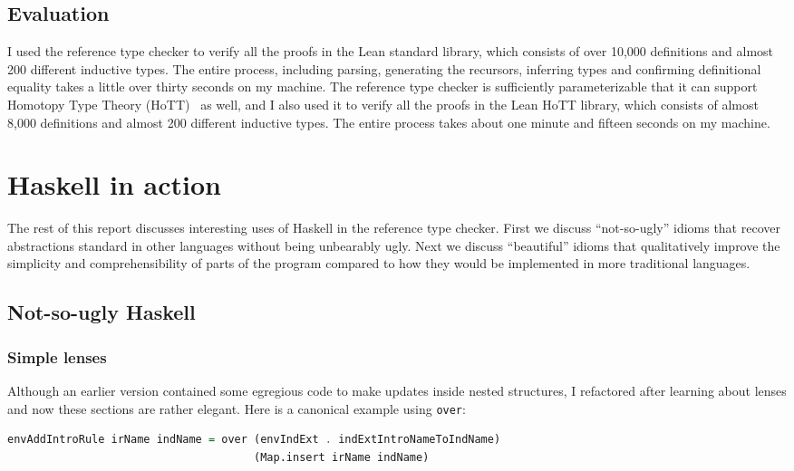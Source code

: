 \documentclass{article}
\begin{document}
\begin{spacing}{1.1}
\subsection{Evaluation}

I used the reference type checker to verify all the proofs in the Lean standard library, which consists of over 10,000 definitions and almost 200 different inductive types. The entire process, including parsing, generating the recursors, inferring types and confirming definitional equality takes a little over thirty seconds on my machine. The reference type checker is sufficiently parameterizable that it can support Homotopy Type Theory (HoTT)~\cite{awodey2015homotopy} as well, and I also used it to verify all the proofs in the Lean HoTT library, which consists of almost 8,000 definitions and almost 200 different inductive types. The entire process takes about one minute and fifteen seconds on my machine.

\section{Haskell in action}

The rest of this report discusses interesting uses of Haskell in the reference type checker. First we discuss ``not-so-ugly'' idioms that recover abstractions standard in other languages without being unbearably ugly. Next we discuss ``beautiful'' idioms that qualitatively improve the simplicity and comprehensibility of parts of the program compared to how they would be implemented in more traditional languages.

\subsection{Not-so-ugly Haskell}

\subsubsection{Simple lenses}

Although an earlier version contained some egregious code to make updates inside nested structures, I refactored after learning about lenses and now these sections are rather elegant. Here is a canonical example using \lstinline{over}:
\begin{lstlisting}[language=Haskell]
envAddIntroRule irName indName = over (envIndExt . indExtIntroNameToIndName)
                                      (Map.insert irName indName)
\end{lstlisting}


\end{spacing}
\end{document}
